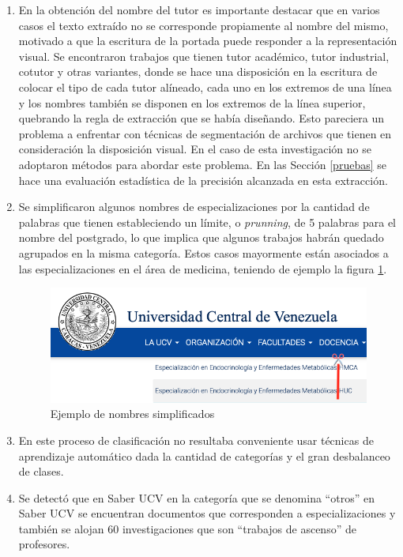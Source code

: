 \documentclass[
  12pt,
  openany]{book}
\begin{document}
\begin{enumerate}
\item
  En la obtención del nombre del tutor es importante destacar que en varios casos el texto extraído no se corresponde propiamente al nombre del mismo, motivado a que la escritura de la portada puede responder a la representación visual. Se encontraron trabajos que tienen tutor académico, tutor industrial, cotutor y otras variantes, donde se hace una disposición en la escritura de colocar el tipo de cada tutor alíneado, cada uno en los extremos de una línea y los nombres también se disponen en los extremos de la línea superior, quebrando la regla de extracción que se había diseñando. Esto pareciera un problema a enfrentar con técnicas de segmentación de archivos que tienen en consideración la disposición visual. En el caso de esta investigación no se adoptaron métodos para abordar este problema. En las Sección \ref{pruebas} se hace una evaluación estadística de la precisión alcanzada en esta extracción.
\item
  Se simplificaron algunos nombres de especializaciones por la cantidad de palabras que tienen estableciendo un límite, o \emph{prunning}, de 5 palabras para el nombre del postgrado, lo que implica que algunos trabajos habrán quedado agrupados en la misma categoría. Estos casos mayormente están asociados a las especializaciones en el área de medicina, teniendo de ejemplo la figura \ref{fig:especial}.

  \begin{figure}

  {\centering \includegraphics[width=0.5\linewidth]{images/05-desarrollo/1_ciclo/especializaciones2} 

  }

  \caption{Ejemplo de nombres simplificados}\label{fig:especial}
  \end{figure}
\item
  En este proceso de clasificación no resultaba conveniente usar técnicas de aprendizaje automático dada la cantidad de categorías y el gran desbalanceo de clases.
\item
  Se detectó que en Saber UCV en la categoría que se denomina ``otros'' en Saber UCV se encuentran documentos que corresponden a especializaciones y también se alojan 60 investigaciones que son ``trabajos de ascenso'' de profesores.
\end{enumerate}
\end{document}
